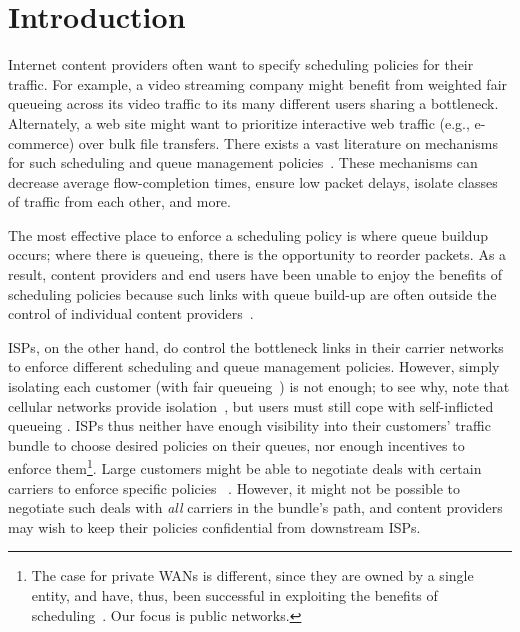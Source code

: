 \section{Introduction}\label{s:intro}

Internet content providers often want to specify scheduling policies for their traffic. 
For example, a video streaming company might benefit from weighted fair queueing across its video traffic to its many different users sharing a bottleneck. Alternately, a web site might want to prioritize interactive web traffic (e.g., e-commerce) over bulk file transfers. 
There exists a vast literature on mechanisms for such scheduling and queue management policies~\cite{diffserv, fair-queueing, sfq, pie, CoDel, fifoplus, virtualClocks, csfq, drr, red, ecn}.
These mechanisms can decrease average flow-completion times, ensure low packet delays, isolate classes of traffic from each other, and more.

The most effective place to enforce a scheduling policy is where queue buildup occurs; where there is queueing, there is the opportunity to reorder packets.
As a result, content providers and end users have been unable to enjoy the benefits of scheduling policies because such links with queue build-up are often outside the control of individual content 
providers~\cite{inferring-interdomain-congestion, isp-throttle-1, isp-throttle-2, isp-throttle-3}. 

ISPs, on the other hand, do control the bottleneck links in their carrier networks to enforce different scheduling and queue management policies. 
However, simply isolating each customer (\eg with fair queueing~\cite{fair-queueing}) is not enough; to see why, note that cellular networks provide isolation~\cite{sprout}, but users must still cope with self-inflicted queueing .
ISPs thus neither have enough visibility into their customers' traffic bundle to choose desired policies on their queues, nor enough incentives to enforce them\footnote{The case for private WANs is different, since they are owned by a single entity, and have, thus, been successful in exploiting the benefits of scheduling~\cite{swan, b4, bwe}. Our focus is public networks.}.
Large customers might be able to negotiate deals with certain carriers to enforce specific policies~\cite{att-qos} . 
However, it might not be possible to negotiate such deals with \emph{all} carriers in the bundle's path, and content providers may wish to keep their policies confidential from downstream ISPs.

